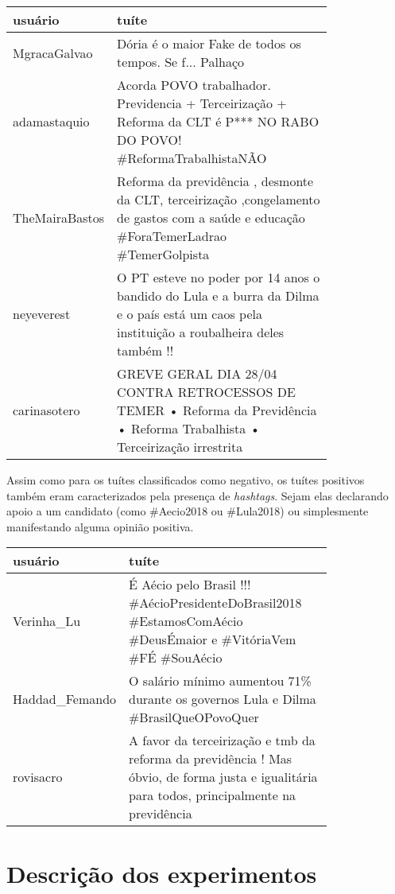 \begin{center}
	\begin{tabular}{| l | p{0.8\linewidth} |}
		\hline
		usuário & tuíte \\
		\hline
		MgracaGalvao & Dória é o maior Fake de todos os tempos. Se f... Palhaço \\
		\hline
		adamastaquio & Acorda POVO trabalhador. Previdencia + Terceirização + Reforma da CLT é P*** NO RABO DO POVO! \#ReformaTrabalhistaNÃO \\
		\hline
		TheMairaBastos & Reforma da previdência , desmonte da CLT, terceirização ,congelamento de gastos com a saúde e educação \#ForaTemerLadrao \#TemerGolpista \\
		\hline
		neyeverest & O PT esteve no poder por 14 anos o bandido do Lula e a burra da Dilma e o país está um caos pela instituição a roubalheira deles também !! \\
		\hline
		carinasotero & GREVE GERAL DIA 28/04 CONTRA RETROCESSOS DE TEMER • Reforma da Previdência • Reforma Trabalhista • Terceirização irrestrita \\
		\hline
	\end{tabular}
\end{center}

Assim como para os tuítes classificados como negativo, os tuítes positivos também eram 
caracterizados pela presença de \textit{hashtags}. Sejam elas declarando apoio a um candidato
(como \#Aecio2018 ou \#Lula2018) ou simplesmente manifestando alguma opinião positiva. 

\begin{center}
	\begin{tabular}{| l | p{0.8\linewidth} |}
		\hline
		usuário & tuíte \\
		\hline
		Verinha_Lu & É Aécio pelo Brasil !!! \#AécioPresidenteDoBrasil2018 \#EstamosComAécio \#DeusÉmaior e \#VitóriaVem \#FÉ \#SouAécio \\
		\hline
		Haddad_Femando & O salário mínimo aumentou 71\% durante os governos Lula e Dilma \#BrasilQueOPovoQuer \\
		\hline
		rovisacro & A favor da terceirização e tmb da reforma da previdência ! Mas óbvio, de forma justa e igualitária para todos, principalmente na previdência \\
		\hline	
	\end{tabular}
\end{center}

\section{Descrição dos experimentos}

